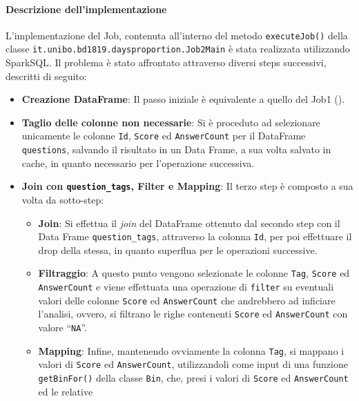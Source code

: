   \paragraph{Descrizione dell'implementazione}\label{par:job2:spark:implementation}

  L'implementazione del Job, contenuta all'interno del metodo \texttt{executeJob()} %
  della classe \texttt{it.unibo.bd1819.daysproportion.Job2Main} è stata realizzata utilizzando SparkSQL\@.
  Il problema è stato affrontato attraverso diversi steps successivi, descritti di seguito:

  \begin{itemize}
    \item
      \textbf{Creazione DataFrame}:
      Il passo iniziale è equivalente a quello del Job1 ().
    \item
      \textbf{Taglio delle colonne non necessarie}:
      Si è proceduto ad selezionare unicamente le colonne \texttt{Id},
      \texttt{Score} ed \texttt{AnswerCount} per il DataFrame \texttt{questions}, salvando il risultato in un Data Frame,
      a sua volta salvato in cache, in quanto necessario per l'operazione successiva.
    \item
      \textbf{Join con \texttt{question\_tags}, Filter e Mapping}:
      Il terzo step è composto a sua volta da sotto-step:
      \begin{itemize}
        \item
          \textbf{Join}:
            Si effettua il \textit{join} del DataFrame ottenuto dal secondo step con il Data Frame \texttt{question\_tags}, attraverso
            la colonna \texttt{Id}, per poi effettuare il drop della stessa, in quanto superflua per le operazioni successive.
        \item
          \textbf{Filtraggio}:
          A questo punto vengono selezionate le colonne \texttt{Tag}, \texttt{Score} ed \texttt{AnswerCount}
          e viene effettuata una operazione di \texttt{filter} su eventuali valori delle colonne \texttt{Score} ed \texttt{AnswerCount}
          che andrebbero ad inficiare l'analisi, ovvero, si filtrano le righe contenenti \texttt{Score} ed \texttt{AnswerCount} con valore ``\texttt{NA}''\@.
        \item
          \textbf{Mapping}:
          Infine, mantenendo ovviamente la colonna \texttt{Tag}, si mappano i valori di \texttt{Score} ed \texttt{AnswerCount}, utilizzandoli come input di una funzione
          \texttt{getBinFor()} della classe \texttt{Bin}, che, presi i valori di \texttt{Score} ed \texttt{AnswerCount} ed le relative %

\end{itemize}
\end{itemize}
